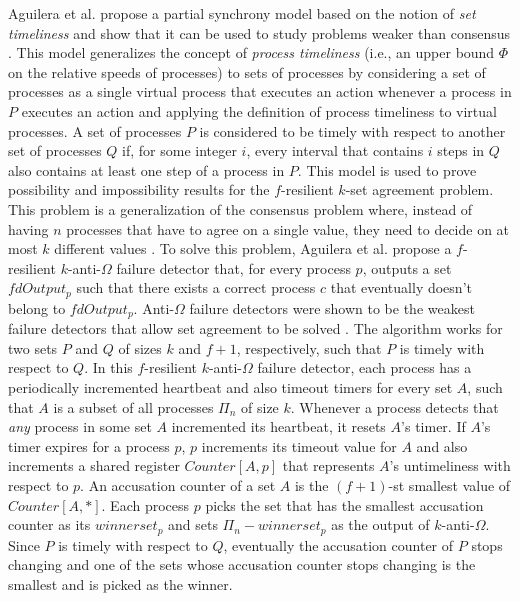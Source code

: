 \documentclass[runningheads,a4paper]{llncs}
\begin{document}
Aguilera et al. propose a partial synchrony model based on the notion of \textit{set timeliness} and show that it can be used to study problems weaker than consensus \cite{Aguilera2012}. This model generalizes the concept of \textit{process timeliness} (i.e., an upper bound $\Phi$ on the relative speeds of processes) \cite{Dwork1988} to sets of processes by considering a set of processes as a single virtual process that executes an action whenever a process in $P$ executes an action and applying the definition of process timeliness to virtual processes. A set of processes $P$ is considered to be timely with respect to another set of processes $Q$ if, for some integer $i$, every interval that contains $i$ steps in $Q$ also contains at least one step of a process in $P$. This model is used to prove possibility and impossibility results for the $f$-resilient $k$-set agreement problem. This problem is a generalization of the consensus problem where, instead of having $n$ processes that have to agree on a single value, they need to decide on at most $k$ different values \cite{Chaudhuri1993}. To solve this problem, Aguilera et al. propose a $f$-resilient $k$-anti-$\Omega$ failure detector that, for every process $p$, outputs a set $fdOutput_p$ such that there exists a correct process $c$ that eventually doesn't belong to $fdOutput_p$. Anti-$\Omega$ failure detectors were shown to be the weakest failure detectors that allow set agreement to be solved \cite{Zielinski2010}. The algorithm works for two sets $P$ and $Q$ of sizes $k$ and $f+1$, respectively, such that $P$ is timely with respect to $Q$. In this $f$-resilient $k$-anti-$\Omega$ failure detector, each process has a periodically incremented heartbeat and also timeout timers for every set $A$, such that $A$ is a subset of all processes $\Pi_n$ of size $k$. Whenever a process detects that \textit{any} process in some set $A$ incremented its heartbeat, it resets $A$'s timer. If $A$'s timer expires for a process $p$, $p$ increments its timeout value for $A$ and also increments a shared register $Counter[A,p]$ that represents $A$'s untimeliness with respect to $p$. An accusation counter of a set $A$ is the $(f+1)$-st smallest value of $Counter[A,*]$. Each process $p$ picks the set that has the smallest accusation counter as its $winnerset_p$ and sets $\Pi_n - winnerset_p$ as the output of $k$-anti-$\Omega$. Since $P$ is timely with respect to $Q$, eventually the accusation counter of $P$ stops changing and one of the sets whose accusation counter stops changing is the smallest and is picked as the winner. \par
\end{document}
